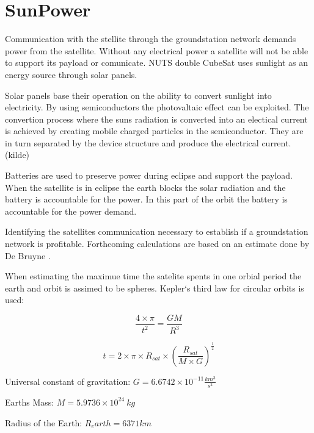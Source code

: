 \section{SunPower}

Communication with the stellite through the groundstation network demands power from the satellite. Without any electrical power a satellite will not be able to support its payload or comunicate. NUTS double CubeSat uses sunlight as an energy source through solar panels. 

Solar panels base their operation on the ability to convert sunlight into electricity. By using semiconductors the photovaltaic effect can be exploited. The convertion process where the suns radiation is converted into an electical current is achieved by creating mobile charged particles in the semiconductor. They are in turn separated by the device structure and produce the electrical current.(kilde) 

Batteries are used to preserve power during eclipse and support the payload. When the satellite is in eclipse the earth blocks the solar radiation and the battery is accountable for the power. In this part of the orbit the battery is accountable for the power demand.

Identifying the satellites communication necessary to establish if a groundstation network is profitable. Forthcoming calculations are based on an estimate done by De Bruyne \cite{Satellite Power Systems}.

\vspace{5 mm} When estimating the maximue time the satelite spents in one orbial period the earth and orbit is assimed to be spheres. Kepler`s third law for circular orbits is used:

\begin{equation}\frac{4\times\pi}{t^2} = \frac{GM}{R^3}
\label{Kepler`s 3.law}
\end{equation}

\begin{equation}t = 2\times\pi\times R_{sat}\times (\frac{R_{sat}}{M\times G})^{\frac{1}{2}}
\label{Time spent in orbit}
\end{equation}

\vspace{5 mm}Universal constant of gravitation: $G = 6.6742\times 10^{-11} \frac{km^3}{s^2}$

Earths Mass: $M = 5.9736\times 10^{24}\ kg$

Radius of the Earth: $R_earth = 6371 km$

